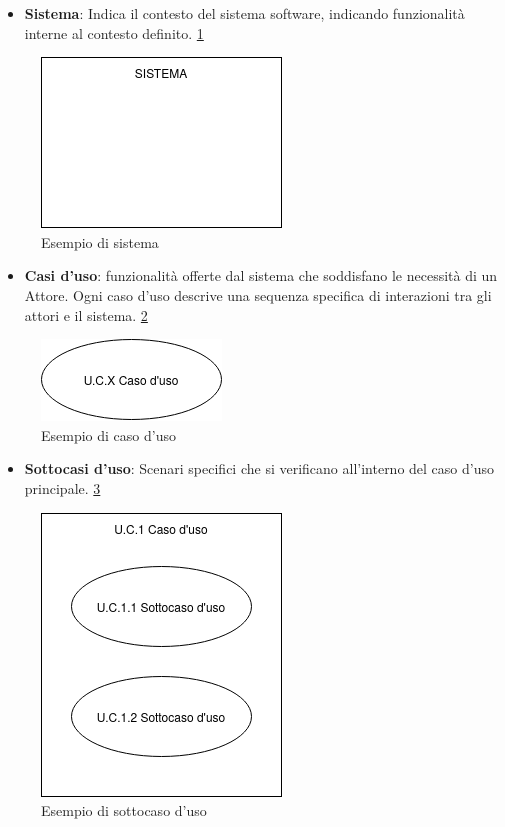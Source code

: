 \begin{itemize}
    \item \textbf{Sistema}: Indica il contesto del sistema software, indicando funzionalità interne al contesto definito. \ref{fig:sistema} 
\end{itemize}

\begin{figure}[H]
    \centering
    \includegraphics{../../img/sistema.png}
    \caption{Esempio di sistema}
    \label{fig:sistema}
\end{figure}

\begin{itemize}
    \item \textbf{Casi d’uso}: funzionalità offerte dal sistema che soddisfano le necessità di un Attore. Ogni caso d’uso descrive una sequenza specifica di interazioni tra gli attori e il sistema. \ref{fig:caso_uso}
\end{itemize}

\begin{figure}[H]
    \centering
    \includegraphics{../../img/CasoUso.png}
    \caption{Esempio di caso d'uso}
    \label{fig:caso_uso}
\end{figure}

\begin{itemize}
    \item \textbf{Sottocasi d’uso}: Scenari specifici che si verificano all'interno del caso d’uso principale. \ref{fig:sottocaso_uso}
\end{itemize}

\begin{figure}[H]
    \centering
    \includegraphics{../../img/Sottocasouso.png}
    \caption{Esempio di sottocaso d'uso}
    \label{fig:sottocaso_uso}
\end{figure}

